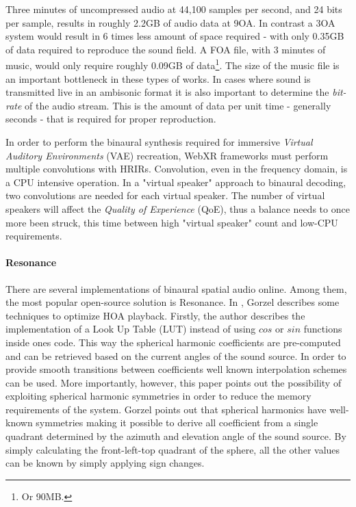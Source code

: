 Three minutes of uncompressed audio at 44,100 samples per second, and 24 bits per sample, results in roughly 2.2GB of audio data at 9OA. In contrast a 3OA system would result in 6 times less amount of space required - with only 0.35GB of data required to reproduce the sound field. A FOA file, with 3 minutes of music, would only require roughly 0.09GB of data\footnote{Or 90MB.}. The size of the music file is an important bottleneck in these types of works. In cases where sound is transmitted live in an ambisonic format it is also important to determine the \textit{bit-rate} of the audio stream. This is the amount of data per unit time - generally seconds - that is required for proper reproduction. 

In order to perform the binaural synthesis required for immersive \textit{Virtual Auditory Environments} (VAE) recreation, WebXR frameworks must perform multiple convolutions with HRIRs. Convolution, even in the frequency domain, is a CPU intensive operation. In a "virtual speaker" approach to binaural decoding, two convolutions are needed for each virtual speaker. The number of virtual speakers will affect the \textit{Quality of Experience} (QoE), thus a balance needs to once more been struck, this time between high "virtual speaker" count and low-CPU requirements. 

\paragraph{Resonance}

There are several implementations of binaural spatial audio online. Among them, the most popular open-source solution is Resonance. In \cite{gorzel2019efficient}, Gorzel describes some techniques to optimize HOA playback. Firstly, the author describes the implementation of a Look Up Table (LUT) instead of using $cos$ or $sin$ functions inside ones code. This way the spherical harmonic coefficients are pre-computed and can be retrieved based on the current angles of the sound source. In order to provide smooth transitions between coefficients well known interpolation schemes can be used. More importantly, however, this paper points out the possibility of exploiting spherical harmonic symmetries in order to reduce the memory requirements of the system. Gorzel points out that spherical harmonics have well-known symmetries making it possible to derive all coefficient from a single quadrant determined by the azimuth and elevation angle of the sound source. By simply calculating the front-left-top quadrant of the sphere, all the other values can be known by simply applying sign changes. 

